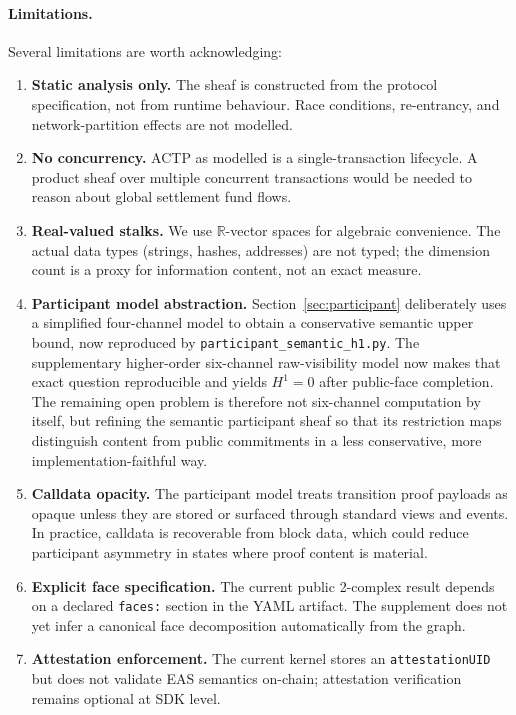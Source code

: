 \documentclass[11pt]{article}
\theoremstyle{plain}
\theoremstyle{definition}
\newcommand{\Hone}{H^{1}}
\newcommand{\RR}{\mathbb{R}}
\begin{document}
\paragraph{Limitations.}
Several limitations are worth acknowledging:
\begin{enumerate}
  \item \textbf{Static analysis only.} The sheaf is constructed from the
        protocol specification, not from runtime behaviour.  Race conditions,
        re-entrancy, and network-partition effects are not modelled.
  \item \textbf{No concurrency.} ACTP as modelled is a single-transaction
        lifecycle.  A product sheaf over multiple concurrent transactions would
        be needed to reason about global settlement fund flows.
  \item \textbf{Real-valued stalks.} We use $\RR$-vector spaces for algebraic
        convenience.  The actual data types (strings, hashes, addresses) are
        not typed; the dimension count is a proxy for information content, not
        an exact measure.
  \item \textbf{Participant model abstraction.} Section~\ref{sec:participant}
        deliberately uses a simplified four-channel model to obtain a
        conservative semantic upper bound, now reproduced by
        \texttt{participant\_\allowbreak semantic\_\allowbreak h1.py}.
        The supplementary higher-order
        six-channel raw-visibility model now makes that exact question
        reproducible and yields $\Hone = 0$ after public-face completion.
        The remaining open problem is therefore not six-channel computation by
        itself, but refining the semantic participant sheaf so that its
        restriction maps distinguish content from public commitments in a
        less conservative, more implementation-faithful way.
  \item \textbf{Calldata opacity.} The participant model treats transition
        proof payloads as opaque unless they are stored or surfaced through
        standard views and events.  In practice, calldata is recoverable from
        block data, which could reduce participant asymmetry in states where
        proof content is material.
  \item \textbf{Explicit face specification.} The current public 2-complex
        result depends on a declared \texttt{faces:} section in the YAML
        artifact.  The supplement does not yet infer a canonical face
        decomposition automatically from the graph.
  \item \textbf{Attestation enforcement.} The current kernel stores an
        \texttt{attestationUID} but does not validate EAS semantics on-chain;
        attestation verification remains optional at SDK level.
\end{enumerate}
\end{document}
